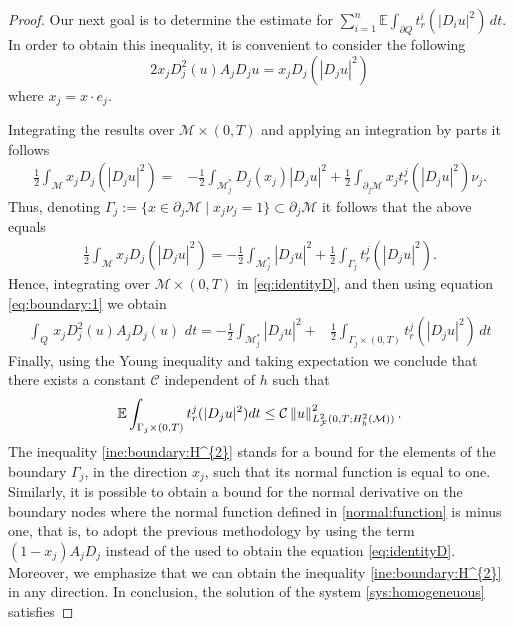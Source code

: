 \documentclass[11pt,oneside,leqno]{amsart}
\numberwithin{equation}{section}
\numberwithin{equation}{section}
\newcommand{\E}{\mathbb{E}}
\begin{document}
\begin{proof}
Our next goal is to determine the estimate for $\displaystyle \sum_{i=1}^{n}\E\int_{\partial Q}t_{r}^{i}(|D_iu|^2)\,dt$. In order to obtain this inequality, it is convenient to consider the following 
\begin{equation}\label{eq:identityD}
2x_{j}D_{j}^2(u)A_{j}D_ju=x_{j}D_{j}(|D_ju|^2)
\end{equation}
where $x_{j}=x\cdot e_{j}$.

Integrating the results over $\mathcal{M}\times(0,T)$ and applying an integration by parts it follows
\begin{align*}
    \frac{1}{2}\int_{\mathcal{M}}x_{j}D_{j}(|D_{j}u|^{2})=&-\frac{1}{2}\int_{\mathcal{M}^{\ast}_{j}}D_{j}(x_{j})|D_{j}u|^{2}+\frac{1}{2}\int_{\partial_{j}\mathcal{M}}x_{j}t_{r}^{j}(|D_{j}u|^{2})\nu_{j}.
\end{align*}
Thus, denoting $\Gamma_{j}:=\{ x\in\partial_{j}\mathcal{M}\mid x_{j}\nu_{j}= 1\}\subset\partial_j\mathcal{M}$ it follows that the above equals
\begin{align}\label{eq:boundary:1}
    \frac{1}{2}\int_{\mathcal{M}}x_{j}D_{j}(|D_{j}u|^{2})=-\frac{1}{2}\int_{\mathcal{M}_{j}^{\ast}}|D_{j}u|^2+\frac{1}{2}\int_{\Gamma_{j}}t_{r}^{j}(|D_{j}u|^{2}).
\end{align}
Hence, integrating over $\mathcal{M}\times (0,T)$ in \eqref{eq:identityD}, and then  using equation \eqref{eq:boundary:1} we obtain
\begin{equation}
\begin{aligned}
\int_{Q}\,x_{j}D_j^2(u)A_{j}D_{j}(u)\,\,dt=-\frac{1}{2}\int_{\mathcal{M}_{j}^{\ast}}|D_{j}u|^2+&\frac{1}{2}\int_{\Gamma_{j}\times(0,T)}t_{r}^{j}(|D_{j}u|^{2})\,dt
\end{aligned}
\end{equation}
Finally, using the Young inequality and taking expectation we conclude that there exists a constant $\mathcal{C}$ independent of $h$ such that
\begin{equation}\label{ine:boundary:H^{2}}
    \E\int_{\Gamma_{j}\times(0,T)}t_{r}^{j}(|D_{j}u|^{2})dt\leq \mathcal{C}\left\| u\right\|^{2}_{L^{2}_{\mathcal{F}}(0,T;H_h^{2}(\mathcal{M}))}.
\end{equation}
The inequality \eqref{ine:boundary:H^{2}} stands for a bound for the elements of the boundary $\Gamma_{j}$, in the direction $x_{j}$, such that its normal function is equal to one. Similarly, it is possible to obtain a bound for the normal derivative on the boundary nodes where the normal function defined in \eqref{normal:function} is minus one, that is, to adopt the previous methodology by using the term $(1-x_{j})A_{j}D_{j}$ instead of the used to obtain the equation \eqref{eq:identityD}. Moreover, we emphasize that we can obtain the inequality \eqref{ine:boundary:H^{2}} in any direction. In conclusion, the solution of the system \eqref{sys:homogeneuous} satisfies

\end{proof}
\end{document}
